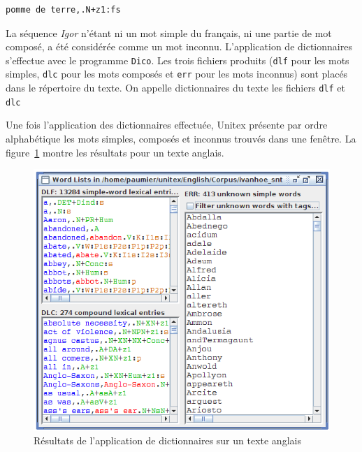 \bigskip
\begin{verbatim}
pomme de terre,.N+z1:fs
\end{verbatim}

\bigskip
\noindent La séquence \textit{Igor} n'étant ni un mot simple du français, ni une partie de mot
composé, a été considérée comme un mot inconnu. L’application de dictionnaires
s’effectue avec le programme \verb+Dico+.
Les trois fichiers produits (\verb+dlf+ pour les mots simples, \verb+dlc+ pour les mots composés et
\verb+err+ pour les mots inconnus) sont placés dans le répertoire du texte. On appelle dictionnaires
du texte les fichiers \verb+dlf+ et \verb+dlc+

\bigskip
\noindent Une fois l’application des dictionnaires effectuée, Unitex présente par ordre alphabétique
les mots simples, composés et inconnus trouvés dans une fenêtre. La figure~\ref{fig-Dico-application-results} montre les résultats pour un texte anglais.

\begin{figure}[!ht]
\begin{center}
\includegraphics[width=12cm]{resources/img/fig2-13.png}
\caption{Résultats de l’application de dictionnaires sur un texte
anglais\label{fig-Dico-application-results}}
\end{center}
\end{figure}

